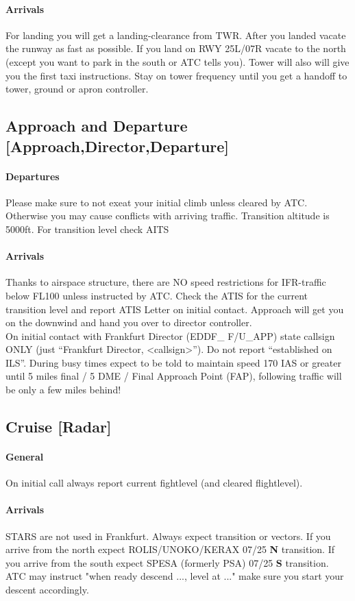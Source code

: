 \paragraph{Arrivals}
For landing you will get a landing-clearance from TWR.
After you landed vacate the runway as fast as possible.
If you land on RWY 25L/07R vacate to the north (except you want to park in the south or ATC tells you).
Tower will also will give you the first taxi instructions.
Stay on tower frequency until you get a handoff to tower, ground or apron controller.

\subsection[APP]{Approach and Departure [Approach,Director,Departure]}
\paragraph{Departures}
Please make sure to not exeat your initial climb unless cleared by ATC.
Otherwise you may cause conflicts with arriving traffic.
Transition altitude is 5000ft. For transition level check AITS

\paragraph{Arrivals}
Thanks to airspace structure, there are NO speed restrictions for IFR-traffic below FL100 unless
instructed by ATC.
Check the ATIS for the current transition level and report ATIS Letter on initial contact.
Approach will get you on the downwind and hand you over to director controller.\\
On initial contact with Frankfurt Director (EDDF\_ F/U\_APP) state callsign ONLY (just “Frankfurt Director, <callsign>”).
Do not report “established on ILS”. During busy times expect to be told to maintain speed 170 IAS or greater until 5 miles final / 5 DME / Final Approach Point (FAP), following traffic will be only a few miles behind! 

\subsection[CTR]{Cruise [Radar]}
\paragraph{General}
On initial call always report current fightlevel (and cleared flightlevel).

\paragraph{Arrivals}
STARS are not used in Frankfurt. Always expect transition or vectors.
If you arrive from the north expect ROLIS/UNOKO/KERAX 07/25 \textbf{N} transition.
If you arrive from the south expect SPESA (formerly PSA) 07/25 \textbf{S} transition.
ATC may instruct "when ready descend ..., level at ..." make sure you start your descent accordingly.
